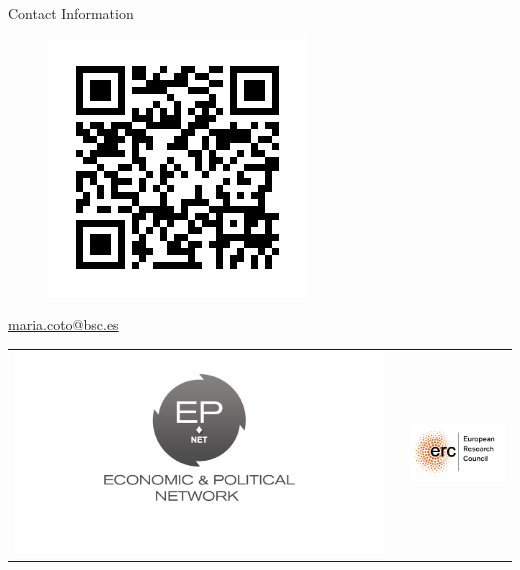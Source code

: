 \documentclass[final]{beamer}
\newlength{\onecolwid}
\begin{document}
\begin{frame}[t]
\begin{columns}[t]
\begin{column}{\onecolwid}
\begin{alertblock}{Contact Information}
\begin{figure}
\includegraphics[width=0.1\linewidth]{images/qrplanet.png}
\end{figure}
\begin{center}
 \href{mailto:maria.coto@bsc.es}{maria.coto@bsc.es}
\end{center}


\end{alertblock}

\begin{center}
\begin{tabular}{ccc}
\includegraphics[width=0.4\linewidth]{images/epnet.png} & \hfill & \includegraphics[width=0.4\linewidth]{images/erc.png}
\end{tabular}
\end{center}


\end{column} %

\end{columns} %

\end{frame} %
\end{document}
